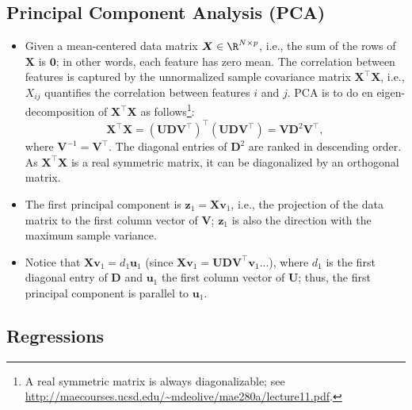     
\subsection{Principal Component Analysis (PCA)}
    \begin{itemize}
        \item Given a mean-centered data matrix $\bm{X} \in \R^{\ndata \times \nfeat}$, i.e., the sum of the rows of $\bm{X}$ is $\bm{0}$; in other words, each feature has zero mean.
        The correlation between features is captured by the unnormalized sample covariance matrix $\bm{X}^\top \bm{X}$, i.e., $X_{ij}$ quantifies the correlation between features $i$ and $j$.
        PCA is to do en  eigen-decomposition of $\bm{X}^\top \bm{X}$ as follows\footnote{A real symmetric matrix is always diagonalizable; see \url{http://maecourses.ucsd.edu/~mdeolive/mae280a/lecture11.pdf}.}:
            \begin{equation}
                \bm{X}^\top \bm{X} = \left( \bm{U}\bm{D}\bm{V}^\top \right)^\top \left( \bm{U}\bm{D}\bm{V}^\top \right) = \bm{V} \bm{D}^2 \bm{V}^\top,
            \end{equation}
        where $\bm{V}^{-1} = \bm{V}^\top$. 
        The diagonal entries of $\bm{D}^2$ are ranked in descending order.
        As $\bm{X}^\top \bm{X}$ is a real symmetric matrix, it can be diagonalized by an orthogonal matrix.
        \item The first principal component is $\bm{z}_1 = \bm{X} \bm{v}_1$, i.e., the projection of the data matrix to the first column vector of $\bm{V}$; $\bm{z}_1$ is also the direction with the maximum sample variance.
        
        \item Notice that $\bm{X} \bm{v}_1 = d_1 \bm{u}_1$ (since $\bm{X} \bm{v}_1 = \bm{U} \bm{D} \bm{V}^\top \bm{v}_1$...), where $d_1$ is the first diagonal entry of $\bm{D}$ and $\bm{u}_1$ the first column vector of $\bm{U}$; thus, the first principal component is parallel to $\bm{u}_1$.
    \end{itemize}


\subsection{Regressions}
